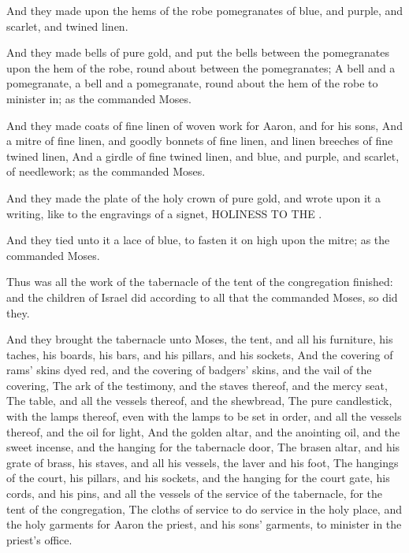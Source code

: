 \verse And they made upon the hems of the robe pomegranates of blue, and purple, and scarlet, and twined linen.

\verse And they made bells of pure gold, and put the bells between the pomegranates upon the hem of the robe, round about between the pomegranates; \verse A bell and a pomegranate, a bell and a pomegranate, round about the hem of the robe to minister in; as the \LORD commanded Moses.

\verse And they made coats of fine linen of woven work for Aaron, and for his sons, \verse And a mitre of fine linen, and goodly bonnets of fine linen, and linen breeches of fine twined linen, \verse And a girdle of fine twined linen, and blue, and purple, and scarlet, of needlework; as the \LORD commanded Moses.

\verse And they made the plate of the holy crown of pure gold, and wrote upon it a writing, like to the engravings of a signet, HOLINESS TO THE \LORD.

\verse And they tied unto it a lace of blue, to fasten it on high upon the mitre; as the \LORD commanded Moses.

\verse Thus was all the work of the tabernacle of the tent of the congregation finished: and the children of Israel did according to all that the \LORD commanded Moses, so did they.

\verse And they brought the tabernacle unto Moses, the tent, and all his furniture, his taches, his boards, his bars, and his pillars, and his sockets, \verse And the covering of rams' skins dyed red, and the covering of badgers' skins, and the vail of the covering, \verse The ark of the testimony, and the staves thereof, and the mercy seat, \verse The table, and all the vessels thereof, and the shewbread, \verse The pure candlestick, with the lamps thereof, even with the lamps to be set in order, and all the vessels thereof, and the oil for light, \verse And the golden altar, and the anointing oil, and the sweet incense, and the hanging for the tabernacle door, \verse The brasen altar, and his grate of brass, his staves, and all his vessels, the laver and his foot, \verse The hangings of the court, his pillars, and his sockets, and the hanging for the court gate, his cords, and his pins, and all the vessels of the service of the tabernacle, for the tent of the congregation, \verse The cloths of service to do service in the holy place, and the holy garments for Aaron the priest, and his sons' garments, to minister in the priest's office.

